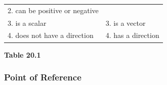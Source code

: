 {\begin{center}
\begin{xtabular*}{\mytablewidth}[t]{|p{10\mystarwidth}|p{10\mystarwidth}|}
    
        2. can be positive or negative%
     \tabularnewline{}
    
    
        3. is a scalar &
    
    
        3. is a vector%
     \tabularnewline{}
    
    
        4. does not have a direction &
    
    
        4. has a direction%
     \tabularnewline{}
    \end{xtabular*}
      \end{center}
    \begin{center}{\small\bfseries Table 20.1}\end{center}
    
    \addtocounter{footnote}{-0}
    
        }%
      
    \par
  
        
\label{m38788*secfhsst!!!underscore!!!id498}
            \subsubsection{  Point of Reference }
            \nopagebreak
            
